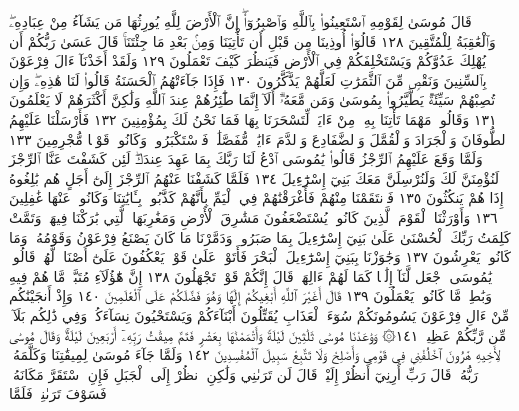 قَالَ مُوسَىٰ لِقَوْمِهِ ٱسْتَعِينُوا۟ بِٱللَّهِ وَٱصْبِرُوٓا۟ۖ إِنَّ ٱلْأَرْضَ
لِلَّهِ يُورِثُهَا مَن يَشَآءُ مِنْ عِبَادِهِۦۖ وَٱلْعَٰقِبَةُ لِلْمُتَّقِينَ ١٢٨
قَالُوٓا۟ أُوذِينَا مِن قَبْلِ أَن تَأْتِيَنَا وَمِنۢ بَعْدِ مَا جِئْتَنَاۚ قَالَ
عَسَىٰ رَبُّكُمْ أَن يُهْلِكَ عَدُوَّكُمْ وَيَسْتَخْلِفَكُمْ فِي ٱلْأَرْضِ
فَيَنظُرَ كَيْفَ تَعْمَلُونَ ١٢٩ وَلَقَدْ أَخَذْنَآ ءَالَ فِرْعَوْنَ
بِٱلسِّنِينَ وَنَقْصࣲ مِّنَ ٱلثَّمَرَٰتِ لَعَلَّهُمْ يَذَّكَّرُونَ ١٣٠
فَإِذَا جَآءَتْهُمُ ٱلْحَسَنَةُ قَالُوا۟ لَنَا هَٰذِهِۦۖ وَإِن تُصِبْهُمْ سَيِّئَةࣱ
يَطَّيَّرُوا۟ بِمُوسَىٰ وَمَن مَّعَهُۥٓۗ أَلَآ إِنَّمَا طَٰٓئِرُهُمْ عِندَ ٱللَّهِ
وَلَٰكِنَّ أَكْثَرَهُمْ لَا يَعْلَمُونَ ١٣١ وَقَالُوا۟ مَهْمَا تَأْتِنَا بِهِۦ
مِنْ ءَايَةࣲ لِّتَسْحَرَنَا بِهَا فَمَا نَحْنُ لَكَ بِمُؤْمِنِينَ ١٣٢ فَأَرْسَلْنَا
عَلَيْهِمُ ٱلطُّوفَانَ وَٱلْجَرَادَ وَٱلْقُمَّلَ وَٱلضَّفَادِعَ وَٱلدَّمَ
ءَايَٰتࣲ مُّفَصَّلَٰتࣲ فَٱسْتَكْبَرُوا۟ وَكَانُوا۟ قَوْمࣰا مُّجْرِمِينَ ١٣٣
وَلَمَّا وَقَعَ عَلَيْهِمُ ٱلرِّجْزُ قَالُوا۟ يَٰمُوسَى ٱدْعُ لَنَا رَبَّكَ بِمَا
عَهِدَ عِندَكَۖ لَئِن كَشَفْتَ عَنَّا ٱلرِّجْزَ لَنُؤْمِنَنَّ لَكَ
وَلَنُرْسِلَنَّ مَعَكَ بَنِيٓ إِسْرَٰٓءِيلَ ١٣٤ فَلَمَّا كَشَفْنَا عَنْهُمُ
ٱلرِّجْزَ إِلَىٰٓ أَجَلٍ هُم بَٰلِغُوهُ إِذَا هُمْ يَنكُثُونَ ١٣٥ فَٱنتَقَمْنَا
مِنْهُمْ فَأَغْرَقْنَٰهُمْ فِي ٱلْيَمِّ بِأَنَّهُمْ كَذَّبُوا۟ بِـَٔايَٰتِنَا وَكَانُوا۟ عَنْهَا
غَٰفِلِينَ ١٣٦ وَأَوْرَثْنَا ٱلْقَوْمَ ٱلَّذِينَ كَانُوا۟ يُسْتَضْعَفُونَ
مَشَٰرِقَ ٱلْأَرْضِ وَمَغَٰرِبَهَا ٱلَّتِي بَٰرَكْنَا فِيهَاۖ وَتَمَّتْ كَلِمَتُ
رَبِّكَ ٱلْحُسْنَىٰ عَلَىٰ بَنِيٓ إِسْرَٰٓءِيلَ بِمَا صَبَرُوا۟ۖ وَدَمَّرْنَا
مَا كَانَ يَصْنَعُ فِرْعَوْنُ وَقَوْمُهُۥ وَمَا كَانُوا۟ يَعْرِشُونَ ١٣٧
وَجَٰوَزْنَا بِبَنِيٓ إِسْرَٰٓءِيلَ ٱلْبَحْرَ فَأَتَوْا۟ عَلَىٰ قَوْمࣲ يَعْكُفُونَ
عَلَىٰٓ أَصْنَامࣲ لَّهُمْۚ قَالُوا۟ يَٰمُوسَى ٱجْعَل لَّنَآ إِلَٰهࣰا كَمَا
لَهُمْ ءَالِهَةࣱۚ قَالَ إِنَّكُمْ قَوْمࣱ تَجْهَلُونَ ١٣٨ إِنَّ هَٰٓؤُلَآءِ مُتَبَّرࣱ
مَّا هُمْ فِيهِ وَبَٰطِلࣱ مَّا كَانُوا۟ يَعْمَلُونَ ١٣٩ قَالَ أَغَيْرَ ٱللَّهِ
أَبْغِيكُمْ إِلَٰهࣰا وَهُوَ فَضَّلَكُمْ عَلَى ٱلْعَٰلَمِينَ ١٤٠ وَإِذْ أَنجَيْنَٰكُم
مِّنْ ءَالِ فِرْعَوْنَ يَسُومُونَكُمْ سُوٓءَ ٱلْعَذَابِ يُقَتِّلُونَ
أَبْنَآءَكُمْ وَيَسْتَحْيُونَ نِسَآءَكُمْۚ وَفِي ذَٰلِكُم بَلَآءࣱ
مِّن رَّبِّكُمْ عَظِيمࣱ ١٤١۞ وَوَٰعَدْنَا مُوسَىٰ ثَلَٰثِينَ لَيْلَةࣰ
وَأَتْمَمْنَٰهَا بِعَشْرࣲ فَتَمَّ مِيقَٰتُ رَبِّهِۦٓ أَرْبَعِينَ لَيْلَةࣰۚ وَقَالَ
مُوسَىٰ لِأَخِيهِ هَٰرُونَ ٱخْلُفْنِي فِي قَوْمِي وَأَصْلِحْ وَلَا تَتَّبِعْ
سَبِيلَ ٱلْمُفْسِدِينَ ١٤٢ وَلَمَّا جَآءَ مُوسَىٰ لِمِيقَٰتِنَا وَكَلَّمَهُۥ
رَبُّهُۥ قَالَ رَبِّ أَرِنِيٓ أَنظُرْ إِلَيْكَۚ قَالَ لَن تَرَىٰنِي وَلَٰكِنِ
ٱنظُرْ إِلَى ٱلْجَبَلِ فَإِنِ ٱسْتَقَرَّ مَكَانَهُۥ فَسَوْفَ تَرَىٰنِيۚ فَلَمَّا
